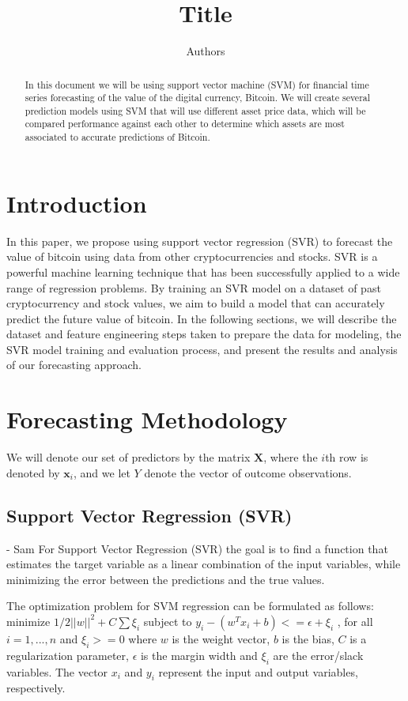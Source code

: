 \documentclass[11pt]{article}
\title{\vspace{-2cm}Title}
\author{Authors}
\date{\vspace{-5ex}}
\theoremstyle{definition}
\newcommand{\bx}{\mathbf{x}}
\newcommand{\bX}{\mathbf{X}}
\begin{document}
 
\maketitle

\begin{abstract}
In this document we will be using support vector machine (SVM) for financial time series forecasting of the value of the digital currency, Bitcoin. We will create several prediction models using SVM that will use different asset price data, which will be compared performance against each other to determine which assets are most associated to accurate predictions of Bitcoin.  

\end{abstract}

\section{Introduction}
In this paper, we propose using support vector regression (SVR) to forecast the value of bitcoin using data from other cryptocurrencies and stocks. SVR is a powerful machine learning technique that has been successfully applied to a wide range of regression problems. By training an SVR model on a dataset of past cryptocurrency and stock values, we aim to build a model that can accurately predict the future value of bitcoin. In the following sections, we will describe the dataset and feature engineering steps taken to prepare the data for modeling, the SVR model training and evaluation process, and present the results and analysis of our forecasting approach.

\section{Forecasting Methodology}
We will denote our set of predictors by the matrix $\bX$, where the $i$th row is denoted by $\bx_i$, and we let $Y$ denote the vector of outcome observations. 


\subsection{Support Vector Regression (SVR)}
- Sam
For Support Vector Regression (SVR) the goal is to find a function that estimates the target variable as a linear combination of the input variables, while minimizing the error between the predictions and the true values.

The optimization problem for SVM regression can be formulated as follows:
minimize $1/2||w||^2 + C \sum \xi_i$
subject to $y_i - (w^T x_i + b) <= \epsilon + \xi_i$ , for all $i = 1, ..., n$ and $\xi_i >= 0$
where $w$ is the weight vector, $b$ is the bias, $C$ is a regularization parameter, $\epsilon$ is the margin width and $\xi_i$ are the error/slack variables. The vector $x_i$ and $y_i$ represent the input and output variables, respectively.
\end{document}
